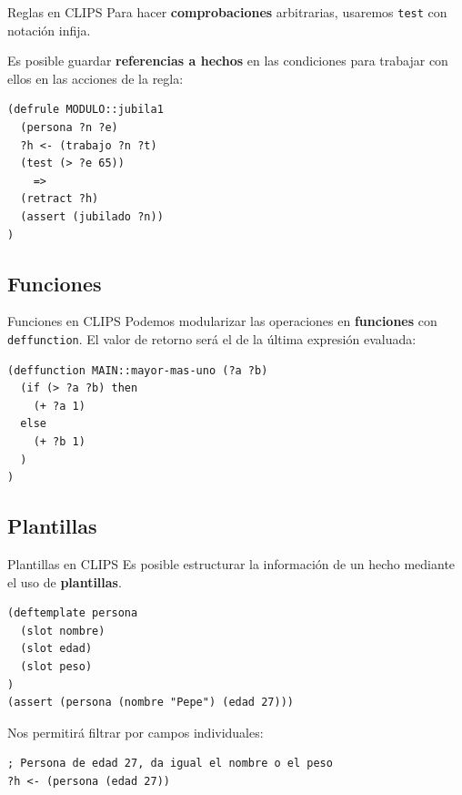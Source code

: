 \documentclass[smaller,spanish,xcolor=svgnames]{beamer}
\begin{document}
\begin{frame}[fragile]{Reglas en CLIPS}
  Para hacer \textbf{comprobaciones} arbitrarias, usaremos \texttt{test} con notación infija.

  \medskip

  Es posible guardar \textbf{referencias a hechos} en las condiciones para trabajar con
  ellos en las acciones de la regla:

\begin{verbatim}
(defrule MODULO::jubila1
  (persona ?n ?e)
  ?h <- (trabajo ?n ?t)
  (test (> ?e 65))
    =>
  (retract ?h)
  (assert (jubilado ?n))
)
\end{verbatim}  
\end{frame}

\subsection{Funciones}

\begin{frame}[fragile]{Funciones en CLIPS}
  Podemos modularizar las operaciones en \textbf{funciones} con \texttt{deffunction}. El
  valor de retorno será el de la última expresión evaluada:

\begin{verbatim}
(deffunction MAIN::mayor-mas-uno (?a ?b)
  (if (> ?a ?b) then
    (+ ?a 1)
  else
    (+ ?b 1)
  )
)
\end{verbatim}
\end{frame}

\subsection{Plantillas}

\begin{frame}[fragile]{Plantillas en CLIPS}
  Es posible estructurar la información de un hecho mediante el uso de
  \textbf{plantillas}.

\begin{verbatim}
(deftemplate persona
  (slot nombre)
  (slot edad)
  (slot peso)
)
(assert (persona (nombre "Pepe") (edad 27)))
\end{verbatim}

  Nos permitirá filtrar por campos individuales:

\begin{verbatim}
; Persona de edad 27, da igual el nombre o el peso
?h <- (persona (edad 27))
\end{verbatim}
  
\end{frame}
\end{document}
